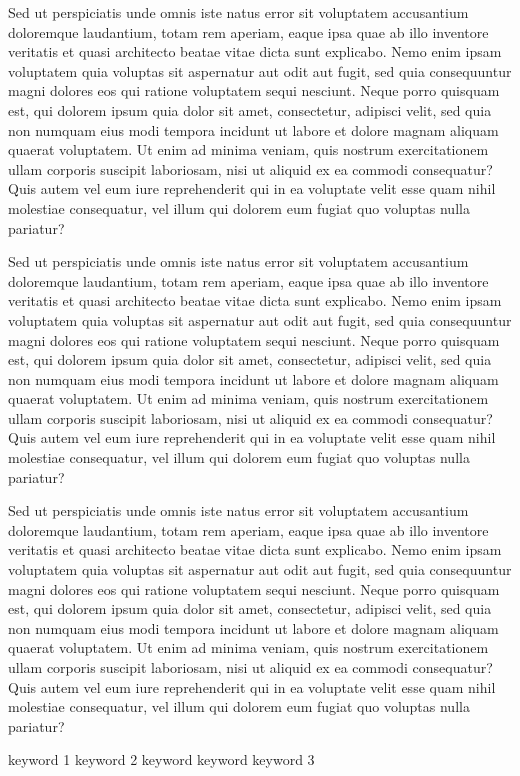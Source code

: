 \documentclass[french, english]{mythesis}
\begin{document}
	\begin{myabstract}[english]

Sed ut perspiciatis unde omnis iste natus error sit voluptatem accusantium doloremque laudantium, totam rem aperiam, eaque ipsa quae ab illo inventore veritatis et quasi architecto beatae vitae dicta sunt explicabo. Nemo enim ipsam voluptatem quia voluptas sit aspernatur aut odit aut fugit, sed quia consequuntur magni dolores eos qui ratione voluptatem sequi nesciunt. Neque porro quisquam est, qui dolorem ipsum quia dolor sit amet, consectetur, adipisci velit, sed quia non numquam eius modi tempora incidunt ut labore et dolore magnam aliquam quaerat voluptatem. Ut enim ad minima veniam, quis nostrum exercitationem ullam corporis suscipit laboriosam, nisi ut aliquid ex ea commodi consequatur? Quis autem vel eum iure reprehenderit qui in ea voluptate velit esse quam nihil molestiae consequatur, vel illum qui dolorem eum fugiat quo voluptas nulla pariatur?

Sed ut perspiciatis unde omnis iste natus error sit voluptatem accusantium doloremque laudantium, totam rem aperiam, eaque ipsa quae ab illo inventore veritatis et quasi architecto beatae vitae dicta sunt explicabo. Nemo enim ipsam voluptatem quia voluptas sit aspernatur aut odit aut fugit, sed quia consequuntur magni dolores eos qui ratione voluptatem sequi nesciunt. Neque porro quisquam est, qui dolorem ipsum quia dolor sit amet, consectetur, adipisci velit, sed quia non numquam eius modi tempora incidunt ut labore et dolore magnam aliquam quaerat voluptatem. Ut enim ad minima veniam, quis nostrum exercitationem ullam corporis suscipit laboriosam, nisi ut aliquid ex ea commodi consequatur? Quis autem vel eum iure reprehenderit qui in ea voluptate velit esse quam nihil molestiae consequatur, vel illum qui dolorem eum fugiat quo voluptas nulla pariatur?
	
		\begin{mylaysummary}
		Sed ut perspiciatis unde omnis iste natus error sit voluptatem accusantium doloremque laudantium, totam rem aperiam, eaque ipsa quae ab illo inventore veritatis et quasi architecto beatae vitae dicta sunt explicabo. Nemo enim ipsam voluptatem quia voluptas sit aspernatur aut odit aut fugit, sed quia consequuntur magni dolores eos qui ratione voluptatem sequi nesciunt. Neque porro quisquam est, qui dolorem ipsum quia dolor sit amet, consectetur, adipisci velit, sed quia non numquam eius modi tempora incidunt ut labore et dolore magnam aliquam quaerat voluptatem. Ut enim ad minima veniam, quis nostrum exercitationem ullam corporis suscipit laboriosam, nisi ut aliquid ex ea commodi consequatur? Quis autem vel eum iure reprehenderit qui in ea voluptate velit esse quam nihil molestiae consequatur, vel illum qui dolorem eum fugiat quo voluptas nulla pariatur?
		\end{mylaysummary}
		
		\begin{mykeywords}
			\mykeyword keyword 1
			\mykeyword keyword 2
			\mykeyword keyword keyword keyword 3
		\end{mykeywords}

	\end{myabstract}
\end{document}
